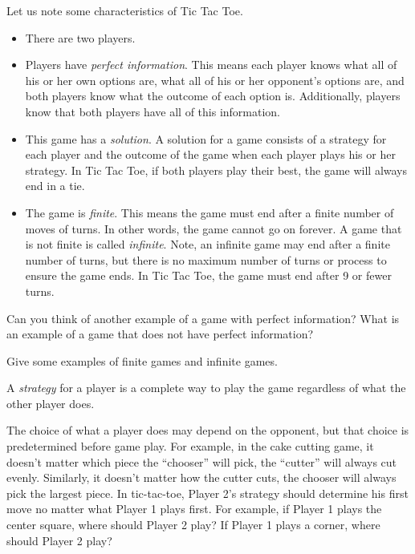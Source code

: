Let us note some characteristics of Tic Tac Toe.
\begin{itemize}
\item There are two players.
\item Players have {\it perfect information}. This means each player knows what all of his or her own options are, what all of his or her opponent's options are, and both players know what the outcome of each option is. Additionally, players know that both players have all of this information.

\item This game has a {\it solution}.  A solution for a game consists of a strategy for each player and the outcome of the game when each player plays his or her strategy. In Tic Tac Toe, if both players play their best, the game will always end in a tie.
\item The game is {\it finite}. This means the game must end after a finite number of moves of turns. In other words, the game cannot go on forever. A game that is not finite is called \emph{infinite}. Note, an infinite game may end after a finite number of turns, but there is no maximum number of turns or process to ensure the game ends. In Tic Tac Toe, the game must end after 9 or fewer turns. 
\end{itemize}

\begin{xca}
Can you think of another  example of a game with perfect information? What is an example of a game that does not have perfect information?
\end{xca}

\begin{xca}
Give some examples of finite games and infinite games.
\end{xca}


\begin{definition} A  \emph{strategy} for a player is a complete way to play the game regardless of what the other player does. 
\end{definition}

The choice of what a player does may depend on the opponent, but that choice is predetermined before game play. For example, in the cake cutting game, it doesn't matter which piece the ``chooser'' will pick, the ``cutter'' will always cut evenly. Similarly, it doesn't matter how the cutter cuts, the chooser will always pick the largest piece. In tic-tac-toe, Player 2's strategy should determine his first move no matter what Player 1 plays first. For  example, if Player 1 plays the center square, where should Player 2 play? If Player 1 plays a corner, where should Player 2 play?    

